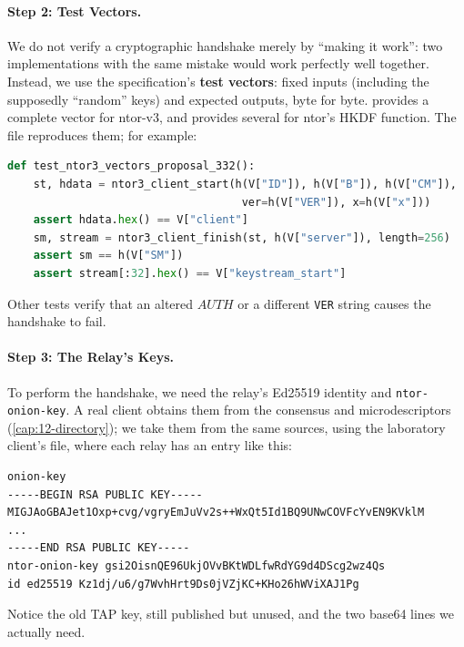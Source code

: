 \paragraph{Step 2: Test Vectors.} We do not verify a cryptographic handshake merely by \enquote{making it work}: two implementations with the same mistake would work perfectly well together. Instead, we use the specification's \textbf{test vectors}: fixed inputs (including the supposedly \enquote{random} keys) and expected outputs, byte for byte.  provides a complete vector for ntor-v3, and  provides several for ntor's HKDF function. The  file reproduces them; for example:
\begin{lstlisting}[language=Python]
def test_ntor3_vectors_proposal_332():
    st, hdata = ntor3_client_start(h(V["ID"]), h(V["B"]), h(V["CM"]),
                                    ver=h(V["VER"]), x=h(V["x"]))
    assert hdata.hex() == V["client"]
    sm, stream = ntor3_client_finish(st, h(V["server"]), length=256)
    assert sm == h(V["SM"])
    assert stream[:32].hex() == V["keystream_start"]
\end{lstlisting}
Other tests verify that an altered $\mathit{AUTH}$ or a different \texttt{VER} string causes the handshake to fail.

\paragraph{Step 3: The Relay's Keys.} To perform the handshake, we need the relay's Ed25519 identity and \texttt{ntor-onion-key}. A real client obtains them from the consensus and microdescriptors (\cref{cap:12-directory}); we take them from the same sources, using the laboratory client's  file, where each relay has an entry like this:
\begin{lstlisting}[numbers=none]
onion-key
-----BEGIN RSA PUBLIC KEY-----
MIGJAoGBAJet1Oxp+cvg/vgryEmJuVv2s++WxQt5Id1BQ9UNwCOVFcYvEN9KVklM
...
-----END RSA PUBLIC KEY-----
ntor-onion-key gsi2OisnQE96UkjOVvBKtWDLfwRdYG9d4DScg2wz4Qs
id ed25519 Kz1dj/u6/g7WvhHrt9Ds0jVZjKC+KHo26hWViXAJ1Pg
\end{lstlisting}
Notice the old TAP key, still published but unused, and the two base64 lines we actually need.

